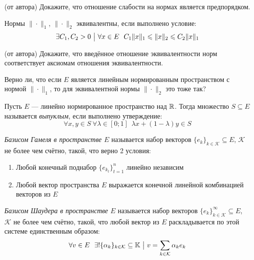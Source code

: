 \begin{exercise} (от автора)
	Докажите, что отношение слабости на нормах является предпорядком.
\end{exercise}

\begin{definition}
	Нормы $\|\cdot\|_1$, $\|\cdot\|_2$ эквивалентны, если выполнено условие:
	\[
		\exists C_1, C_2 > 0 \such \forall x \in E\ \ C_1\|x\|_1 \le \|x\|_2 \le C_2\|x\|_1
	\]
\end{definition}

\begin{exercise} (от автора)
	Докажите, что введённое отношение эквивалентности норм соответствует аксиомам отношения эквивалентности.
\end{exercise}

\begin{exercise}
	Верно ли, что если $E$ является линейным нормированным пространством с нормой $\|\cdot\|_1$, то для эквивалентной нормы $\|\cdot\|_2$ это тоже так?
\end{exercise}

\begin{definition}
	Пусть $E$ --- линейно нормированное пространство над $\mathbb{R}$. Тогда множество $S \subseteq E$ называется \textit{выпуклым}, если выполнено утверждение:
	\[
		\forall x, y \in S\ \forall \lambda \in [0; 1]\ \ \lambda x + (1 - \lambda)y \in S
	\]
\end{definition}

\begin{definition}
	\textit{Базисом Гамеля в пространстве $E$} называется набор векторов $\{e_k\}_{k \in \mathcal{K}} \subseteq E$, $\mathcal{K}$ не более чем счётно, такой, что верно 2 условия:
	\begin{enumerate}
		\item Любой конечный поднабор $\{e_{k_t}\}_{t = 1}^n$ линейно независим
		
		\item Любой вектор пространства $E$ выражается конечной линейной комбинацией векторов из $E$
	\end{enumerate}
\end{definition}

\begin{definition}
	\textit{Базисом Шаудера в пространстве $E$} называется набор векторов $\{e_k\}_{k \in \mathcal{K}}^\infty \subseteq E$, $\mathcal{K}$ не более чем счётно, такой, что любой вектор из $E$ раскладывается по этой системе единственным образом:
	\[
		\forall v \in E\ \ \exists! \{\alpha_k\}_{k \in \mathcal{K}} \subseteq \mathbb{K} \ \big|\  v = \sum_{k \in \mathcal{K}} \alpha_ke_k
	\]
\end{definition}

